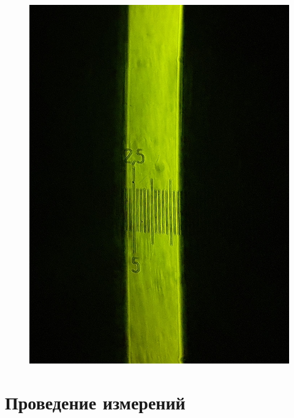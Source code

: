 \documentclass[14pt, a4paper]{report}
\begin{document}
\begin{figure}[H]
\centering
\includegraphics[scale=0.2]{../images/431m_1}
\end{figure}

\section{Проведение измерений}
\end{document}
